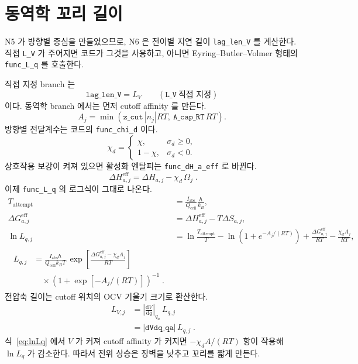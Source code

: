 \documentclass[11pt,a4paper]{article}
\newcommand{\dd}{\mathrm{d}}
\newcommand{\cellc}{\mathrm{cell}}
\newcommand{\eff}{\mathrm{eff}}
\newcommand{\abs}{\mathrm{abs}}
\begin{document}
\section{동역학 꼬리 길이}\label{sec:n6}
N5 가 방향별 중심을 만들었으므로, N6 은 전이별 지연 길이 \texttt{lag\_len\_V} 를 계산한다. 직접 \texttt{L\_V} 가 주어지면 코드가 그것을 사용하고, 아니면 Eyring--Butler--Volmer 형태의 \texttt{func\_L\_q} 를 호출한다.

직접 지정 branch 는
\begin{equation}
\texttt{lag\_len\_V}=L_V\qquad(\texttt{L\_V}\ \text{직접 지정})
\label{eq:LVoverride}
\end{equation}
이다. 동역학 branch 에서는 먼저 cutoff affinity 를 만든다.
\begin{equation}
A_j=\min\!\left(\texttt{z\_cut}\,|n_j|RT,\ \texttt{A\_cap\_RT}\,RT\right).
\label{eq:Acut}
\end{equation}
방향별 전달계수는 코드의 \texttt{func\_chi\_d} 이다.
\begin{equation}
\boxed{\;\chi_d=
\begin{cases}
\chi,&\sigma_d\ge0,\\
1-\chi,&\sigma_d<0.
\end{cases}\;}
\label{eq:chid}
\end{equation}
상호작용 보강이 켜져 있으면 활성화 엔탈피는 \texttt{func\_dH\_a\_eff} 로 바뀐다.
\begin{equation}
\boxed{\;\Delta H_{a,j}^{\eff}=\Delta H_{a,j}-\chi_d\,\Omega_j\;.}
\label{eq:dHeff}
\end{equation}
이제 \texttt{func\_L\_q} 의 로그식이 그대로 나온다.
\begin{align}
T_{\mathrm{attempt}}&=\frac{I_{\abs}}{Q_{\cellc}}\frac{h}{k_B},\label{eq:Tattempt}\\
\Delta G_{a,j}^{\eff}&=\Delta H_{a,j}^{\eff}-T\Delta S_{a,j},\label{eq:dGeff}\\
\ln L_{q,j}
&=\ln\frac{T_{\mathrm{attempt}}}{T}
-\ln\!\left(1+e^{-A_j/(RT)}\right)
+\frac{\Delta G_{a,j}^{\eff}}{RT}
-\frac{\chi_d A_j}{RT},\label{eq:lnLq}\\
\boxed{\;\begin{aligned}
L_{q,j}
&=\frac{I_{\abs}h}{Q_{\cellc}k_BT}\,
\exp\!\left[\frac{\Delta G_{a,j}^{\eff}-\chi_d A_j}{RT}\right]\\
&\quad{}\times\left(1+\exp[-A_j/(RT)]\right)^{-1}\;.
\end{aligned}}
\label{eq:Lq}
\end{align}
전압축 길이는 cutoff 위치의 OCV 기울기 크기로 환산한다.
\begin{equation}
\boxed{\;\begin{aligned}
L_{V,j}
&=\left|\frac{\dd V}{\dd q}\right|_{q_a}\,L_{q,j}\\
&=|\texttt{dVdq\_qa}|\,L_{q,j}\;.
\end{aligned}}
\label{eq:LV}
\end{equation}
식~\eqref{eq:lnLq} 에서 $V$ 가 커져 cutoff affinity 가 커지면 $-\chi_dA/(RT)$ 항이 작용해 $\ln L_q$ 가 감소한다. 따라서 전위 상승은 장벽을 낮추고 꼬리를 짧게 만든다.
\end{document}
